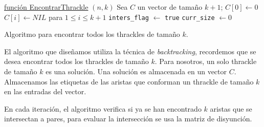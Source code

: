   \begin{algorithm}[p]
      \DontPrintSemicolon
      \underline{función EncontrarThrackle} $(n,k)$\;
      Sea $C$ un vector de tamaño $k+1$;
      $C[0]\gets 0$\;
      $C[i]\gets NIL$ para $ 1 \leq i \leq k+1$\;
      \texttt{inters\_flag} $\gets$ \texttt{true}\;
      \texttt{curr\_size} $\gets 0$\;
    \caption{Algoritmo para encontrar todos los thrackles de tamaño $k$.}
    \label{algo_kthrackles}
  \end{algorithm}

  El algoritmo que diseñamos utiliza la técnica de \emph{backtracking},
  recordemos que se desea encontrar todos los thrackles de tamaño $k$. Para
  nosotros, un solo thrackle de tamaño $k$ es una solución. Una solución es
  almacenada en un vector $C$. Almacenamos las etiquetas de las aristas que
  conforman un thrackle de tamaño $k$ en las entradas del vector.

  En cada iteración, el algoritmo verifica si ya se han encontrado $k$ aristas
  que se intersectan a pares, para evaluar la intersección se usa la matriz de
  disyunción.

